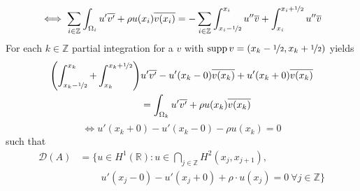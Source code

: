 \documentclass[fontsize=14pt,a4paper,DIV=1]{scrartcl}
\numberwithin{equation}{section}
\def\supp{\operatorname{supp}}
\newcommand{\R}{\mathbb{R}}
\newcommand{\Z}{\mathbb{Z}}
\begin{document}
	\[ \iff \sum_{i \in \Z} \int_{\Omega_{i}} u' \overline{v'} + \rho u(x_{i}) \overline{v(x_{i})} = - \sum_{i \in \Z} \int_{x_{i} - \nicefrac{1}{2}}^{x_{i}} u'' \overline{v} + \int_{x_{i}}^{x_{i} + \nicefrac{1}{2}} u'' \overline{v} \]
	For each $k \in \Z$ partial integration for a $v$ with $\supp v = (x_{k} - \nicefrac{1}{2}, x_{k} + \nicefrac{1}{2})$ yields
	\begin{align*}
		\left( \int_{x_{k} - \nicefrac{1}{2}}^{x_{k}} + \int_{x_{k}}^{x_{k} +\nicefrac{1}{2}} \right) & u' \overline{v'} - u'(x_{k}-0) \overline{v(x_{k})}  + u'(x_{k}+0) \overline{v(x_{k})} \\
		 & = \int_{\Omega_{k}} u' \overline{v'} + \rho u(x_{k}) \overline{v(x_{k})}
	\end{align*}
	\[ \iff u'(x_{k}+0) - u'(x_{k}-0) - \rho u(x_{k}) = 0 \]
	such that
	\begin{align*}
		\mathcal{D}(A) & = \big\{ u \in H^{1}(\R): u \in \bigcap_{j \in \Z} H^{2}(x_{j} , x_{j+1}), \\
		& ~\qquad u'(x_{j} - 0) - u'(x_{j} + 0) + \rho \cdot u(x_{j}) = 0 ~\forall j \in \Z \big\}
	\end{align*} 
\end{document}

